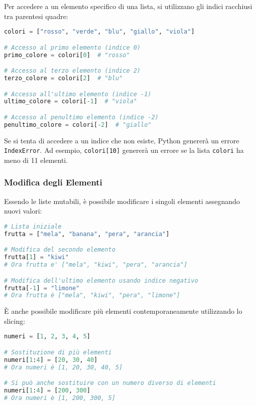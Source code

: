 Per accedere a un elemento specifico di una lista, si utilizzano gli indici racchiusi tra parentesi quadre:

\begin{lstlisting}[language=Python]
colori = ["rosso", "verde", "blu", "giallo", "viola"]

# Accesso al primo elemento (indice 0)
primo_colore = colori[0]  # "rosso"

# Accesso al terzo elemento (indice 2)
terzo_colore = colori[2]  # "blu"

# Accesso all'ultimo elemento (indice -1)
ultimo_colore = colori[-1]  # "viola"

# Accesso al penultimo elemento (indice -2)
penultimo_colore = colori[-2]  # "giallo"
\end{lstlisting}

\begin{attenzione}
Se si tenta di accedere a un indice che non esiste, Python genererà un errore \texttt{IndexError}. Ad esempio, \texttt{colori[10]} genererà un errore se la lista \texttt{colori} ha meno di 11 elementi.
\end{attenzione}

\subsubsection{Modifica degli Elementi}\label{ModificaEleListe}

Essendo le liste mutabili, è possibile modificare i singoli elementi assegnando nuovi valori:

\begin{lstlisting}[language=Python]
# Lista iniziale
frutta = ["mela", "banana", "pera", "arancia"]

# Modifica del secondo elemento
frutta[1] = "kiwi"
# Ora frutta e' ["mela", "kiwi", "pera", "arancia"]

# Modifica dell'ultimo elemento usando indice negativo
frutta[-1] = "limone"
# Ora frutta è ["mela", "kiwi", "pera", "limone"]
\end{lstlisting}

È anche possibile modificare più elementi contemporaneamente utilizzando lo slicing:

\begin{lstlisting}[language=Python]
numeri = [1, 2, 3, 4, 5]

# Sostituzione di più elementi
numeri[1:4] = [20, 30, 40]
# Ora numeri è [1, 20, 30, 40, 5]

# Si può anche sostituire con un numero diverso di elementi
numeri[1:4] = [200, 300]
# Ora numeri è [1, 200, 300, 5]
\end{lstlisting}

